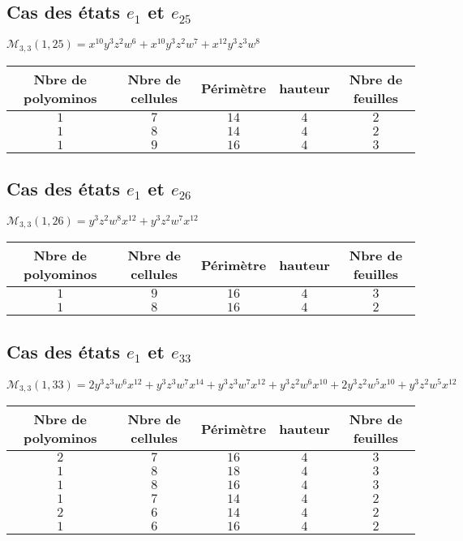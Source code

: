 \documentclass[12pt]{memoireuqam1.3}
\begin{document}
\subsection*{Cas des états $e_{1}$ et $e_{25}$ }
$\mathcal{M}_{3,3}(1,25)=x^{10}y^3z^2w^6+x^{10}y^3z^2w^7+x^{12}y^3z^3w^8
$\\
\begin{tabular}{|c|c|c|c|c|}
 \hline
  Nbre de polyominos & Nbre de cellules & Périmètre & hauteur &Nbre de feuilles\\
 \hline
 $1$ & $7$ & $14$ & $4$ &$2$\\
 \hline
 $1$ & $8$ & $14$ & $4$ &$2$\\
 \hline
 $1$ & $9$ & $16$ & $4$ &$3$\\
 \hline
\end{tabular}
\subsection*{Cas des états $e_{1}$ et $e_{26}$ }
$\mathcal{M}_{3,3}(1,26)=y^3z^2w^8x^{12}+y^3z^2w^7x^{12}$\\
\begin{tabular}{|c|c|c|c|c|}
 \hline
  Nbre de polyominos & Nbre de cellules & Périmètre & hauteur &Nbre de feuilles\\
 \hline
 $1$ & $9$ & $16$ & $4$ &$3$\\
 \hline
 $1$ & $8$ & $16$ & $4$ &$2$\\
 \hline
\end{tabular}
\subsection*{Cas des états $e_{1}$ et $e_{33}$ }
$\mathcal{M}_{3,3}(1,33)=2y^3z^3w^6x^{12}+y^3z^3w^7x^{14}+y^3z^3w^7x^{12}+y^3z^2w^6x^{10}+2y^3z^2w^5x^{10}+y^3z^2w^5x^{12}
$\\
\begin{tabular}{|c|c|c|c|c|}
 \hline
  Nbre de polyominos & Nbre de cellules & Périmètre & hauteur &Nbre de feuilles\\
 \hline
 $2$ & $7$ & $16$ & $4$ &$3$\\
 \hline
 $1$ & $8$ & $18$ & $4$ &$3$\\
 \hline
 $1$ & $8$ & $16$ & $4$ &$3$\\
 \hline
 $1$ & $7$ & $14$ & $4$ &$2$\\
 \hline
 $2$ & $6$ & $14$ & $4$ &$2$\\
 \hline
 $1$ & $6$ & $16$ & $4$ &$2$\\
 \hline
\end{tabular}
\end{document}
